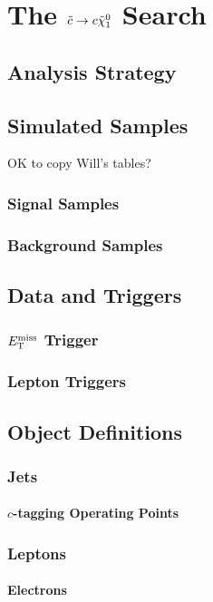 \chapter{The $\tilde{c} \to c \tilde{\chi}_1^0$ Search}

\section{Analysis Strategy}
\label{sec:analysis-strategy}


\section{Simulated Samples}
OK to copy Will's tables?
\subsection{Signal Samples}
\subsection{Background Samples}

\section{Data and Triggers}
\subsection{$E_{\rm T}^{\rm miss}$ Trigger}
\subsection{Lepton Triggers}

\section{Object Definitions}
\subsection{Jets}
\subsubsection{$c$-tagging Operating Points}
\subsection{Leptons}
\subsubsection{Electrons}
